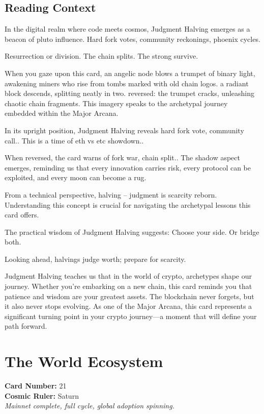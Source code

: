 \documentclass[11pt,oneside]{book}
\begin{document}
\begin{minipage}[t]{0.55\textwidth}
  \subsection*{Reading Context}
  In the digital realm where code meets cosmos, Judgment Halving emerges as a beacon of pluto influence. Hard fork votes, community reckonings, phoenix cycles.

  Resurrection or division. The chain splits. The strong survive.

  When you gaze upon this card, an angelic node blows a trumpet of binary light, awakening miners who rise from tombs marked with old chain logos. a radiant block descends, splitting neatly in two. reversed: the trumpet cracks, unleashing chaotic chain fragments. This imagery speaks to the archetypal journey embedded within the Major Arcana.

  In its upright position, Judgment Halving reveals hard fork vote, community call.. This is a time of eth vs etc showdown..

  When reversed, the card warns of fork war, chain split.. The shadow aspect emerges, reminding us that every innovation carries risk, every protocol can be exploited, and every moon can become a rug.

  From a technical perspective, halving – judgment is scarcity reborn. Understanding this concept is crucial for navigating the archetypal lessons this card offers.

  The practical wisdom of Judgment Halving suggests: Choose your side. Or bridge both.

  Looking ahead, halvings judge worth; prepare for scarcity.

  Judgment Halving teaches us that in the world of crypto, archetypes shape our journey. Whether you're embarking on a new chain, this card reminds you that patience and wisdom are your greatest assets. The blockchain never forgets, but it also never stops evolving. As one of the Major Arcana, this card represents a significant turning point in your crypto journey—a moment that will define your path forward.

\end{minipage}

\newpage
\section*{The World Ecosystem}

\begin{minipage}[t]{0.55\textwidth}
  \vspace{0pt}
  \textbf{Card Number:} 21\\  \textbf{Cosmic Ruler:} Saturn\\  \textit{Mainnet complete, full cycle, global adoption spinning.}
\end{minipage}
\end{document}
